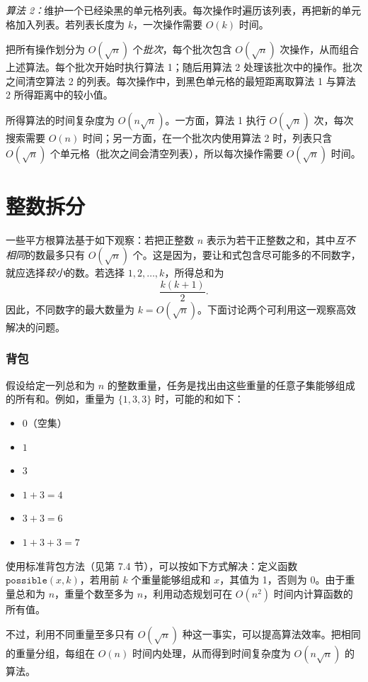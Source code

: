 \emph{算法 2：}维护一个已经染黑的单元格列表。每次操作时遍历该列表，再把新的单元格加入列表。若列表长度为 $k$，一次操作需要 $O(k)$ 时间。

把所有操作划分为 $O(\sqrt n)$ 个\emph{批次}，每个批次包含 $O(\sqrt n)$ 次操作，从而组合上述算法。每个批次开始时执行算法 1；随后用算法 2 处理该批次中的操作。批次之间清空算法 2 的列表。每次操作中，到黑色单元格的最短距离取算法 1 与算法 2 所得距离中的较小值。

所得算法的时间复杂度为 $O(n \sqrt n)$。一方面，算法 1 执行 $O(\sqrt n)$ 次，每次搜索需要 $O(n)$ 时间；另一方面，在一个批次内使用算法 2 时，列表只含 $O(\sqrt n)$ 个单元格（批次之间会清空列表），所以每次操作需要 $O(\sqrt n)$ 时间。

\section{整数拆分}

一些平方根算法基于如下观察：若把正整数 $n$ 表示为若干正整数之和，其中\emph{互不相同}的数最多只有 $O(\sqrt n)$ 个。这是因为，要让和式包含尽可能多的不同数字，就应选择\emph{较小}的数。若选择 $1,2,\ldots,k$，所得总和为
\[\frac{k(k+1)}{2}.\]
因此，不同数字的最大数量为 $k = O(\sqrt n)$。下面讨论两个可利用这一观察高效解决的问题。

\subsubsection{背包}

假设给定一列总和为 $n$ 的整数重量，任务是找出由这些重量的任意子集能够组成的所有和。例如，重量为 $\{1,3,3\}$ 时，可能的和如下：

\begin{itemize}[noitemsep]
\item $0$（空集）
\item $1$
\item $3$
\item $1+3=4$
\item $3+3=6$
\item $1+3+3=7$
\end{itemize}

使用标准背包方法（见第 7.4 节），可以按如下方式解决：定义函数 $\texttt{possible}(x,k)$，若用前 $k$ 个重量能够组成和 $x$，其值为 1，否则为 0。由于重量总和为 $n$，重量个数至多为 $n$，利用动态规划可在 $O(n^2)$ 时间内计算函数的所有值。

不过，利用不同重量至多只有 $O(\sqrt n)$ 种这一事实，可以提高算法效率。把相同的重量分组，每组在 $O(n)$ 时间内处理，从而得到时间复杂度为 $O(n \sqrt n)$ 的算法。

